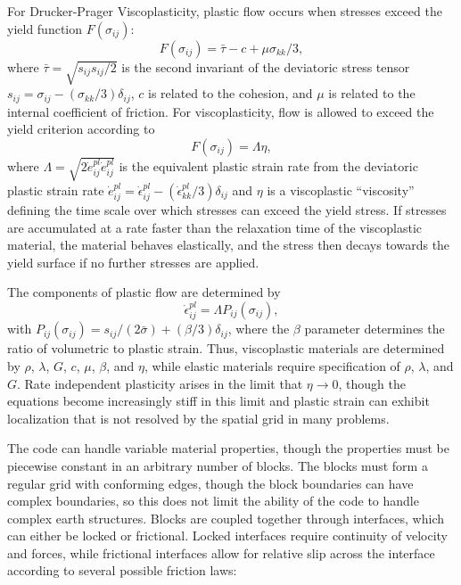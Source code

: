 \documentclass[12pt]{article}   	%
\begin{document}
For Drucker-Prager Viscoplasticity, plastic flow occurs when stresses exceed the yield function $F(\sigma_{ij})$:
\begin{equation}
F(\sigma_{ij}) = \bar{\tau}-c+\mu\sigma_{kk}/3,
\end{equation}
where $\bar{\tau}=\sqrt{s_{ij}s_{ij}/2}$ is the second invariant of the deviatoric stress tensor $s_{ij}=\sigma_{ij}-(\sigma_{kk}/3)\delta_{ij}$, $c$ is related to the cohesion, and $\mu$ is related to the internal coefficient of friction. For viscoplasticity, flow is allowed to exceed the yield criterion according to
\begin{equation}
F(\sigma_{ij})=\Lambda\eta,
\end{equation}
where $\Lambda=\sqrt{2\dot{e}^{pl}_{ij}\dot{e}^{pl}_{ij}}$ is the equivalent plastic strain rate from the deviatoric plastic strain rate $\dot{e}^{pl}_{ij}=\dot{\epsilon}^{pl}_{ij}-(\dot{\epsilon}^{pl}_{kk}/3)\delta_{ij}$ and $\eta$ is a viscoplastic ``viscosity'' defining the time scale over which stresses can exceed the yield stress. If stresses are accumulated at a rate faster than the relaxation time of the viscoplastic material, the material behaves elastically, and the stress then decays towards the yield surface if no further stresses are applied.

The components of plastic flow are determined by
\begin{equation}
\dot{\epsilon}^{pl}_{ij}=\Lambda P_{ij}\left(\sigma_{ij}\right),
\end{equation}
with $P_{ij}(\sigma_{ij})=s_{ij}/(2\bar{\sigma})+(\beta/3)\delta_{ij}$, where the $\beta$ parameter determines the ratio of volumetric to plastic strain. Thus, viscoplastic materials are determined by $\rho$, $\lambda$, $G$, $c$, $\mu$, $\beta$, and $\eta$, while elastic materials require specification of $\rho$, $\lambda$, and $G$. Rate independent plasticity arises in the limit that $\eta \rightarrow 0$, though the equations become increasingly stiff in this limit and plastic strain can exhibit localization that is not resolved by the spatial grid in many problems.

The code can handle variable material properties, though the properties must be piecewise constant in an arbitrary number of blocks. The blocks must form a regular grid with conforming edges, though the block boundaries can have complex boundaries, so this does not limit the ability of the code to handle complex earth structures. Blocks are coupled together through interfaces, which can either be locked or frictional. Locked interfaces require continuity of velocity and forces, while frictional interfaces allow for relative slip across the interface according to several possible friction laws:
\end{document}
